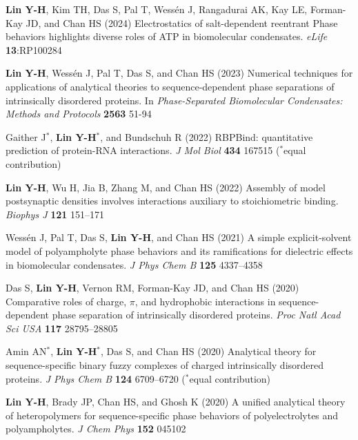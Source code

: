 \documentclass[11pt]{../yhlcv}
\def\tname#1{{\bf #1}}
\begin{document}
\begin{etaremune}[leftmargin=0.26in]\itemsep-0.2pt

\item
\tname{Lin Y-H}, Kim TH, Das S, Pal T, Wessén J, Rangadurai AK, Kay LE, Forman-Kay JD, and Chan HS (2024)
Electrostatics of salt-dependent reentrant Phase behaviors highlights diverse roles of ATP in biomolecular condensates.
{\it eLife} {\bf 13}:RP100284


\item
\tname{Lin Y-H}, Wessén J, Pal T, Das S, and Chan HS (2023)
Numerical techniques for applications of analytical theories to sequence-dependent phase separations of intrinsically disordered proteins.
In {\it Phase-Separated Biomolecular Condensates: Methods and Protocols} {\bf 2563} 51-94

\item
Gaither J$^*$, \tname{Lin Y-H}$^*$, and Bundschuh R (2022)
RBPBind: quantitative prediction of protein-RNA interactions.
{\it J Mol Biol} {\bf 434} 167515
($^*$equal contribution)

\item 
\tname{Lin Y-H}, Wu H, Jia B, Zhang M, and Chan HS (2022)
Assembly of model postsynaptic densities involves interactions auxiliary to stoichiometric binding.
{\it Biophys J} {\bf 121} 151--171

\item 
Wessén J, Pal T, Das S, \tname{Lin Y-H}, and Chan HS (2021)
A simple explicit-solvent model of polyampholyte phase behaviors and its ramifications for dielectric effects in biomolecular condensates.
{\it J Phys Chem B} {\bf 125} 4337--4358 %

\item 
Das S, \tname{Lin Y-H}, Vernon RM, Forman-Kay JD, and Chan HS (2020)
Comparative roles of charge, $\pi$, and hydrophobic interactions in sequence-dependent phase separation of intrinsically disordered proteins.
{\it Proc Natl Acad Sci USA} {\bf 117} 28795--28805

\item 
Amin AN$^*$, \tname{Lin Y-H}$^*$, Das S, and Chan HS (2020)
Analytical theory for sequence-specific binary fuzzy complexes of charged intrinsically disordered proteins.
{\it J Phys Chem B} 
{\bf 124} 6709--6720
($^*$equal contribution) %

\item
\tname{Lin Y-H}, Brady JP, Chan HS, and Ghosh K (2020)
A unified analytical theory of heteropolymers for sequence-specific phase behaviors of polyelectrolytes and polyampholytes. 
{\it J Chem Phys} {\bf 152} 045102


\end{etaremune}
\end{document}
